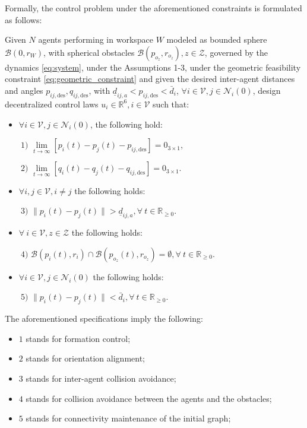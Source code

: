 Formally, the control problem under the aforementioned constraints is
formulated as follows:

\begin{problem} \label{problem}
	Given $N$ agents performing in workspace $W$ modeled as bounded sphere
  $\mathcal{B}(0,r_W)$, with spherical obstacles
  $\mathcal{B}(p_{o_z}, r_{o_z}), z \in \mathcal{Z}$, governed by the dynamics
  \eqref{eq:system}, under the Assumptions 1-3, under the geometric feasibility
  constraint \eqref{eq:geometric_constraint} and given the desired inter-agent
  distances and angles $p_{ij, \text{des}}, q_{ij, \text{des}}$, with
  $\underline{d}_{ij, a} < p_{ij, \text{des}} < \bar{d}_{i}$, $\forall i \in \mathcal{V}, j \in \mathcal{N}_i(0)$,
  design decentralized control laws $u_i \in\mathbb{R}^6,i\in\mathcal{V}$
  such that:

	\begin{itemize}
		\item $\forall i \in \mathcal{V}, j \in \mathcal{N}_i(0)$,
      the following hold:

		$\ 1)$ $\lim\limits_{t \to \infty} \left[ p_{i}(t)-p_{j}(t) - p_{ij, \text{des}} \right] = 0_{3\times1}$,

		$\ 2)$ $\lim\limits_{t \to \infty} \left[q_{i}(t) - q_{j}(t) - q_{ij, \text{des}}\right] = 0_{3\times1}$.

		\item \noindent $\forall i,j \in \mathcal{V}, i \neq j$ the following holds:

		$\ 3)$ $\|p_i(t)-p_j(t)\| > \underline{d}_{ij, a}, \forall \ t \in \mathbb{R}_{\geq 0}$.
		\item $\forall \ i \in \mathcal{V}, z \in \mathcal{Z}$ the following holds:

		$\ 4)$ $\mathcal{B}(p_i(t), r_i) \cap \mathcal{B}(p_{o_z}(t), r_{o_z}) = \emptyset, \forall \ t \in \mathbb{R}_{\geq 0}$.

		\item $\forall i \in \mathcal{V}, j \in \mathcal{N}_i(0)$ the following holds:

		$\ 5)$ $\|p_i(t)-p_j(t)\| < \bar{d}_{i}, \forall \ t \in \mathbb{R}_{\geq 0}$.
	\end{itemize}

\end{problem}

\noindent The aforementioned specifications imply the following:
\begin{itemize}
	\item $1$ stands for formation control;
	\item $2$ stands for orientation alignment;
	\item $3$ stands for inter-agent collision avoidance;
	\item $4$ stands for collision avoidance between the agents and the obstacles;
	\item $5$ stands for connectivity maintenance of the initial graph;
\end{itemize}

